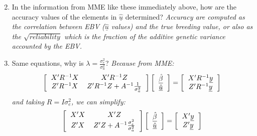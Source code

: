 \documentclass[12pt,a4paper]{paper}
\begin{document}
\begin{enumerate}
\begin{equation}
\end{equation}
\item In the information from MME like these immediately above, how are the accuracy values of the elements in $\underline{\hat{u}}$ determined? \textit{Accuracy are computed as the correlation between EBV ($\underline{\hat{u}}$ values) and the true breeding value, or also as the $\sqrt{reliability}$ which is the fraction of the additive genetic variance accounted by the EBV.}
\item Same equations, why is $\lambda = \frac{\sigma^{2}_{e}}{\sigma^{2}_{a}}$? \textit{Because from MME:}
\begin{equation}
\begin{split}
\left[\begin{tabular}{cc}
$X'R^{-1}X$&$X'R^{-1}Z$\\
$Z'R^{-1}X$&$Z'R^{-1}Z + A^{-1}\frac{1}{\sigma^{2}_{a}}$\\
\end{tabular}\right] \left[\begin{tabular}{c}
$\underline{\hat{\beta}}$\\
$\underline{\hat{u}}$
\end{tabular}\right] &= \left[\begin{tabular}{c}
$X'R^{-1}\underline{y}$\\
$Z'R^{-1}\underline{y}$
\end{tabular}\right]\\
\end{split}
\end{equation}
\textit{and taking $R = I\sigma^{2}_{e}$, we can simplify:}
\begin{equation}
\begin{split}
\left[\begin{tabular}{cc}
$X'X$&$X'Z$\\
$Z'X$&$Z'Z + A^{-1}\frac{\sigma^{2}_{e}}{\sigma^{2}_{a}}$\\
\end{tabular}\right] \left[\begin{tabular}{c}
$\underline{\hat{\beta}}$\\
$\underline{\hat{u}}$
\end{tabular}\right] &= \left[\begin{tabular}{c}
$X'\underline{y}$\\
$Z'\underline{y}$
\end{tabular}\right]\\
\end{split}
\end{equation}

\end{enumerate}
\end{document}
